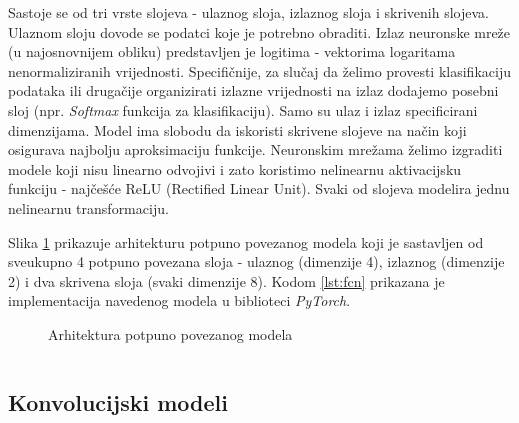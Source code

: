 Sastoje se od tri vrste slojeva - ulaznog sloja, izlaznog sloja i skrivenih slojeva. Ulaznom sloju dovode se podatci koje je potrebno obraditi. Izlaz neuronske mreže (u najosnovnijem obliku) predstavljen je logitima  - vektorima logaritama nenormaliziranih vrijednosti. Specifičnije, za slučaj da želimo provesti klasifikaciju podataka ili drugačije organizirati izlazne vrijednosti na izlaz dodajemo posebni sloj (npr. \textit{Softmax} funkcija za klasifikaciju). Samo su ulaz i izlaz specificirani dimenzijama. Model ima slobodu da iskoristi skrivene slojeve na način koji osigurava najbolju aproksimaciju funkcije. Neuronskim mrežama želimo izgraditi modele koji nisu linearno odvojivi i zato koristimo nelinearnu aktivacijsku funkciju - najčešće ReLU (Rectified Linear Unit). Svaki od slojeva modelira jednu nelinearnu transformaciju.

Slika \ref{fig:nn} \cite{NNsvg} prikazuje arhitekturu potpuno povezanog modela koji je sastavljen od sveukupno 4 potpuno povezana sloja - ulaznog (dimenzije 4), izlaznog (dimenzije 2) i dva skrivena sloja (svaki dimenzije 8). Kodom \ref{lst:fcn} prikazana je implementacija navedenog modela u biblioteci \textit{PyTorch}.

\begin{figure}[H]
    \centering
    \caption{Arhitektura potpuno povezanog modela}
    \label{fig:nn}
\end{figure}

\begin{listing}[H]
    \caption{Implementacija potpuno povezanog modela na slici \ref{fig:nn} koristeći biblioteku \textit{PyTorch}}
    \inputminted{python}{snippets/fcn.py}
    \label{lst:fcn}
\end{listing}

\subsection{Konvolucijski modeli}

